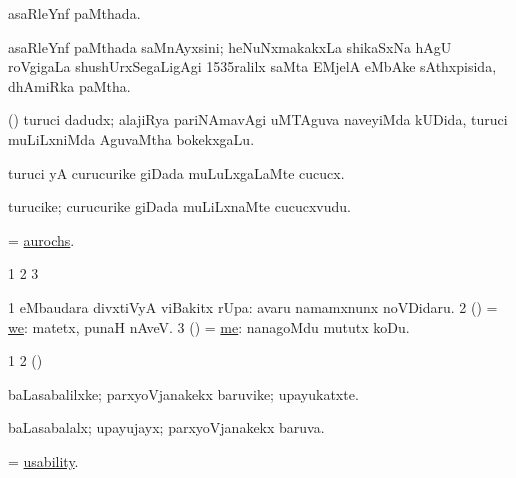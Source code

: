 \bentry
{} 
\gl{\gu}
\expl{}
\bmng
asaRleYnf paMthada. 
\emng
\eentry

\bentry
{} 
\gl{\nA}
\expl{}
\bmng
asaRleYnf paMthada saMnAyxsini; heNuNxmakakxLa shikaSxNa hAgU roVgigaLa shushUrxSegaLigAgi 1535ralilx saMta EMjelA eMbAke sAthxpisida, dhAmiRka paMtha. 
\emng
\eentry

\bentry
{} 
\gl{\nA}
\expl{}
\bmng
(\veYshA) turuci dadudx; alajiRya pariNAmavAgi uMTAguva naveyiMda kUDida, turuci muLiLxniMda AguvaMtha bokekxgaLu. 
\emng
\eentry

\bentry
{} 
\gl{\sakirx}
\expl{}
\bmng
turuci yA curucurike giDada muLuLxgaLaMte cucucx. 
\emng
\eentry

\bentry
{} 
\gl{\nA}
\expl{}
\bmng
turucike; curucurike giDada muLiLxnaMte cucucxvudu. 
\emng
\eentry

\bentry
{} 
\gl{\nA}
\expl{}
\bmng
= \hyperref{kandict_a.pdf}{A}{aurochs}{aurochs}. 
\emng
\eentry

\bentry
{}
\gl{\saMkiSx}
\expl{}
\bmng
\bnum
\num{1}  
\num{2}  
\num{3}  
\enum
\emng
\eentry

\bentry
{} 
\gl{\sanA}
\expl{}
\bmng
\bnum
\num{1}  eMbaudara divxtiVyA viBakitx rUpa:  avaru namamxnunx noVDidaru. 
\num{2} (\AmA) = \hyperref{kandict_w.pdf}{W}{we}{we}:  matetx, punaH nAveV. 
\num{3} (\AmA) = \hyperref{kandict_m.pdf}{M}{me(1)}{me}:  nanagoMdu mututx koDu. 
\enum
\emng
\eentry

\bentry
{} 
\gl{\saMkiSx}
\expl{}
\bmng
\bnum
\num{1}  
\num{2} (\ame)  
\enum
\emng
\eentry

\bentry
{} 
\gl{\nA}
\expl{}
\bmng
baLasabalilxke; parxyoVjanakekx baruvike; upayukatxte. 
\emng
\eentry

\bentry
{} 
\gl{\gu}
\expl{}
\bmng
baLasabalalx; upayujayx; parxyoVjanakekx baruva. 
\emng
\eentry

\bentry
{} 
\gl{\nA}
\expl{}
\bmng
= \hyperlink{usability}{usability}. 
\emng
\eentry

